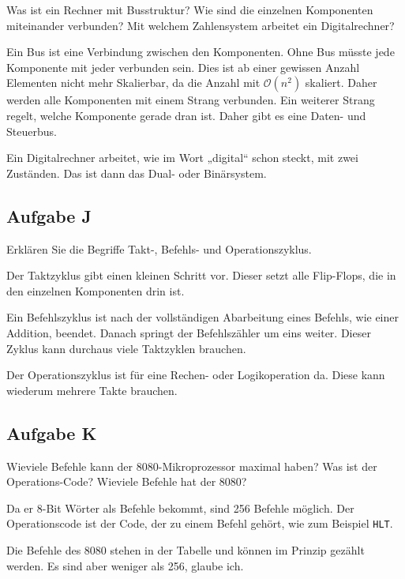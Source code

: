 \begin{problem}
	Was ist ein Rechner mit Busstruktur? Wie sind die einzelnen Komponenten
	miteinander verbunden? Mit welchem Zahlensystem arbeitet ein
	Digitalrechner?
\end{problem}

Ein Bus ist eine Verbindung zwischen den Komponenten. Ohne Bus müsste jede
Komponente mit jeder verbunden sein. Dies ist ab einer gewissen Anzahl
Elementen nicht mehr Skalierbar, da die Anzahl mit $\mathcal O(n^2)$ skaliert.
Daher werden alle Komponenten mit einem Strang verbunden. Ein weiterer Strang
regelt, welche Komponente gerade dran ist. Daher gibt es eine Daten- und
Steuerbus.

Ein Digitalrechner arbeitet, wie im Wort „digital“ schon steckt, mit zwei
Zuständen. Das ist dann das Dual- oder Binärsystem.

\subsection{Aufgabe J}

\begin{problem}
	Erklären Sie die Begriffe Takt-, Befehls- und Operationszyklus.
\end{problem}

Der Taktzyklus gibt einen kleinen Schritt vor. Dieser setzt alle Flip-Flops,
die in den einzelnen Komponenten drin ist.

Ein Befehlszyklus ist nach der
vollständigen Abarbeitung eines Befehls, wie einer Addition, beendet. Danach
springt der Befehlszähler um eins weiter. Dieser Zyklus kann durchaus viele
Taktzyklen brauchen.

Der Operationszyklus ist für eine Rechen- oder Logikoperation da. Diese kann
wiederum mehrere Takte brauchen.

\subsection{Aufgabe K}

\begin{problem}
	Wieviele Befehle kann der 8080-Mikroprozessor maximal haben? Was ist der
	Operations-Code? Wieviele Befehle hat der 8080?
\end{problem}

Da er 8-Bit Wörter als Befehle bekommt, sind 256 Befehle möglich. Der
Operationscode ist der Code, der zu einem Befehl gehört, wie zum Beispiel
\texttt{HLT}.

Die Befehle des 8080 stehen in der Tabelle und können im Prinzip gezählt
werden. Es sind aber weniger als 256, glaube ich.

